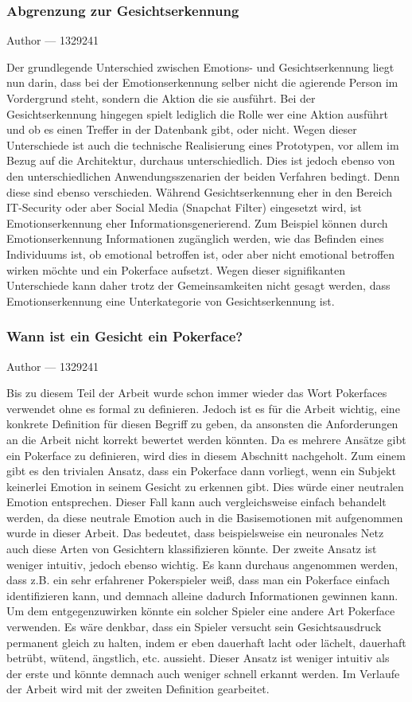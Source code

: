 \documentclass[12pt, a4paper]{report}
\makeatletter
\newcommand{\sectionauthor}[1]{%
  {\parindent0pt\vspace*{-5pt}%
  \large{Author --- }
  \linespread{1.1}\large\scshape#1%
  \par\nobreak\vspace*{35pt} }
  \@afterheading%
}
\makeatother
\begin{document}
\subsubsection{Abgrenzung zur Gesichtserkennung}
\sectionauthor{1329241}
Der grundlegende Unterschied zwischen Emotions- und Gesichtserkennung liegt nun darin, dass bei der Emotionserkennung selber nicht die agierende Person im Vordergrund steht, sondern die Aktion die sie ausführt. Bei der Gesichtserkennung hingegen spielt lediglich die Rolle wer eine Aktion ausführt und ob es einen Treffer in der Datenbank gibt, oder nicht. Wegen dieser Unterschiede ist auch die technische Realisierung eines Prototypen, vor allem im Bezug auf die Architektur,  durchaus unterschiedlich. Dies ist jedoch ebenso von den unterschiedlichen Anwendungsszenarien der beiden Verfahren bedingt.
Denn diese sind ebenso verschieden. Während Gesichtserkennung eher in den Bereich IT-Security oder aber Social Media (Snapchat Filter) eingesetzt wird, ist Emotionserkennung eher Informationsgenerierend.
Zum Beispiel können durch Emotionserkennung Informationen zugänglich werden, wie das Befinden eines Individuums ist, ob emotional betroffen ist, oder aber nicht emotional betroffen wirken möchte und ein Pokerface aufsetzt.
Wegen dieser signifikanten Unterschiede kann daher trotz der Gemeinsamkeiten nicht gesagt werden, dass Emotionserkennung eine Unterkategorie von Gesichtserkennung ist.

\subsubsection{Wann ist ein Gesicht ein Pokerface?}
\sectionauthor{1329241}
\label{pokerface}
Bis zu diesem Teil der Arbeit wurde schon immer wieder das Wort Pokerfaces verwendet ohne es formal zu definieren. Jedoch ist es für die Arbeit wichtig, eine konkrete Definition für diesen Begriff zu geben, da ansonsten die Anforderungen an die Arbeit nicht korrekt bewertet werden könnten. Da es mehrere Ansätze gibt ein Pokerface zu definieren, wird dies in diesem Abschnitt nachgeholt. Zum einem gibt es den trivialen Ansatz, dass ein Pokerface dann vorliegt, wenn ein Subjekt keinerlei Emotion in seinem Gesicht zu erkennen gibt. Dies würde einer neutralen Emotion entsprechen. Dieser Fall kann auch vergleichsweise einfach behandelt werden, da diese neutrale Emotion auch in die Basisemotionen mit aufgenommen wurde in dieser Arbeit. Das bedeutet, dass beispielsweise ein neuronales Netz auch diese Arten von Gesichtern klassifizieren könnte. \newline
Der zweite Ansatz ist weniger intuitiv, jedoch ebenso wichtig. Es kann durchaus angenommen werden, dass z.B. ein sehr erfahrener Pokerspieler weiß, dass man ein Pokerface einfach identifizieren kann, und demnach alleine dadurch Informationen gewinnen kann. Um dem entgegenzuwirken könnte ein solcher Spieler eine andere Art Pokerface verwenden. Es wäre denkbar, dass ein Spieler versucht sein Gesichtsausdruck permanent gleich zu halten, indem er eben dauerhaft lacht oder lächelt, dauerhaft betrübt, wütend, ängstlich, etc. aussieht. Dieser Ansatz ist weniger intuitiv als der erste und könnte demnach auch weniger schnell erkannt werden. Im Verlaufe der Arbeit wird mit der zweiten Definition gearbeitet.
\end{document}
